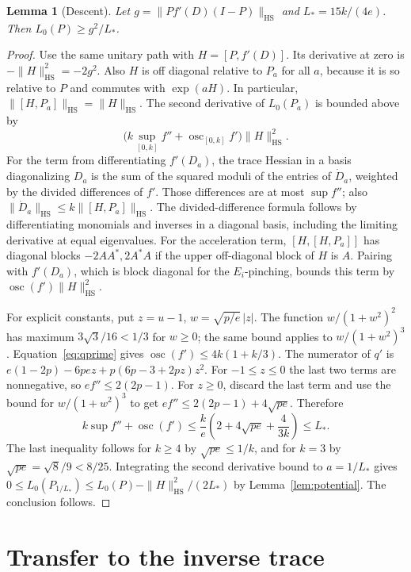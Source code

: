 \documentclass[11pt]{article}
\newtheorem{lemma}{Lemma}[section]
\newcommand{\osc}{\operatorname{osc}}
\newcommand{\HS}{\mathrm{HS}}
\begin{document}
\begin{lemma}[Descent]\label{lem:descent}
Let \(g=\|P f'(D)(I-P)\|_{\HS}\) and \(L_*=15k/(4e)\). Then
\(L_0(P)\ge g^2/L_*\).
\end{lemma}

\begin{proof}
Use the same unitary path with \(H=[P,f'(D)]\). Its derivative
at zero is \(-\|H\|_{\HS}^2=-2g^2\). Also \(H\) is off diagonal
relative to \(P_a\) for all \(a\), because it is so relative to \(P\)
and commutes with \(\exp(aH)\). In particular,
\(\|[H,P_a]\|_{\HS}=\|H\|_{\HS}\).
The second derivative of \(L_0(P_a)\) is bounded above by
\[
\big(k\sup_{[0,k]} f''+\osc_{[0,k]} f'\big)\|H\|_{\HS}^2.
\]
For the term from differentiating \(f'(D_a)\), the trace Hessian in
a basis diagonalizing \(D_a\) is the sum of the squared moduli of
the entries of \(\dot D_a\), weighted by the divided differences
of \(f'\). Those differences are at most \(\sup f''\);
also \(\|\dot D_a\|_{\HS}\le k\|[H,P_a]\|_{\HS}\).
The divided-difference formula follows by differentiating monomials
and inverses in a diagonal basis, including the limiting derivative
at equal eigenvalues. For the acceleration term,
\([H,[H,P_a]]\) has diagonal blocks \(-2AA^*,2A^*A\)
if the upper off-diagonal block of \(H\) is \(A\). Pairing with
\(f'(D_a)\), which is block diagonal for the \(E_i\)-pinching,
bounds this term by \(\osc(f')\|H\|_{\HS}^2\).

For explicit constants, put \(z=u-1\), \(w=\sqrt{p/e}\,|z|\).
The function \(w/(1+w^2)^2\) has maximum \(3\sqrt3/16<1/3\)
for \(w\ge0\); the same bound applies to \(w/(1+w^2)^3\).
Equation~\eqref{eq:qprime} gives \(\osc(f')\le4k(1+k/3)\).
The numerator of \(q'\) is
\(e(1-2p)-6pe z+p(6p-3+2pz)z^2\).
For \(-1\le z\le0\) the last two terms are nonnegative,
so \(e f''\le2(2p-1)\). For \(z\ge0\), discard the last
term and use the bound for \(w/(1+w^2)^3\) to get
\(e f''\le2(2p-1)+4\sqrt{pe}\). Therefore
\[
 k\sup f''+\osc(f')\le
 \frac{k}{e}\left(2+4\sqrt{pe}+\frac{4}{3k}\right)\le L_* .
\]
The last inequality follows for \(k\ge4\) by \(\sqrt{pe}\le1/k\),
and for \(k=3\) by \(\sqrt{pe}=\sqrt8/9<8/25\).
Integrating the second derivative bound to \(a=1/L_*\)
gives \(0\le L_0(P_{1/L_*})\le L_0(P)-\|H\|_{\HS}^2/(2L_*)\)
by Lemma~\ref{lem:potential}. The conclusion follows.
\end{proof}

\section{Transfer to the inverse trace}\label{sec:transfer}
\end{document}
